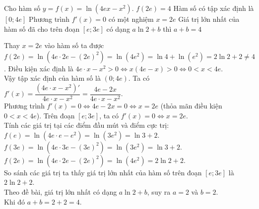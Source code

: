 \begin{ex}%
	Cho hàm số $y = f(x) = \ln(4ex - x^2)$.
	\choiceTF
	{ $f(2e) = 4$}
	{ Hàm số có tập xác định là $[0; 4e]$}
	{\True Phương trình $f'(x) = 0$ có một nghiệm $x = 2e$}
	{\True Giá trị lớn nhất của hàm số đã cho trên đoạn $[e; 3e]$ có dạng $a\ln 2 + b$ thì $a + b = 4$}
	\loigiai
	{
		\begin{itemchoice}
			\itemch Thay $x = 2e$ vào hàm số ta được $f(2e) = \ln(4e\cdot 2e - (2e)^2) = \ln(4e^2) = \ln 4 + \ln(e^2) = 2\ln 2 + 2 \neq 4$.
			\itemch Điều kiện xác định là $4e\cdot x - x^2 > 0 \Leftrightarrow x(4e - x) > 0 \Leftrightarrow 0 < x < 4e$. \\ 
			Vậy tập xác định của hàm số là $(0; 4e)$.
			\itemch Ta có $f'(x) = \dfrac{(4e\cdot x - x^2)'}{4e\cdot x - x^2} = \dfrac{4e - 2x}{4e\cdot x - x^2}$.\\
			Phương trình $f'(x) = 0 \Leftrightarrow 4e - 2x = 0 \Leftrightarrow x = 2e$ (thỏa mãn điều kiện $0 < x < 4e$).
			\itemch Trên đoạn $[e; 3e]$, ta có $f'(x) = 0 \Leftrightarrow x = 2e$.\\
			Tính các giá trị tại các điểm đầu mút và điểm cực trị:\\
			$f(e) = \ln(4e\cdot e - e^2) = \ln(3e^2) = \ln 3 + 2$.\\
			$f(3e) = \ln(4e\cdot 3e - (3e)^2) = \ln(3e^2) = \ln 3 + 2$.\\
			$f(2e) = \ln(4e\cdot 2e - (2e)^2) = \ln(4e^2) = 2\ln 2 + 2$.\\
			So sánh các giá trị ta thấy giá trị lớn nhất của hàm số trên đoạn $[e; 3e]$ là $2\ln 2 + 2$.\\
			Theo đề bài, giá trị lớn nhất có dạng $a\ln 2 + b$, suy ra $a = 2$ và $b = 2$.\\
			Khi đó $a + b = 2 + 2 = 4$.
		\end{itemchoice}
	}
\end{ex}

